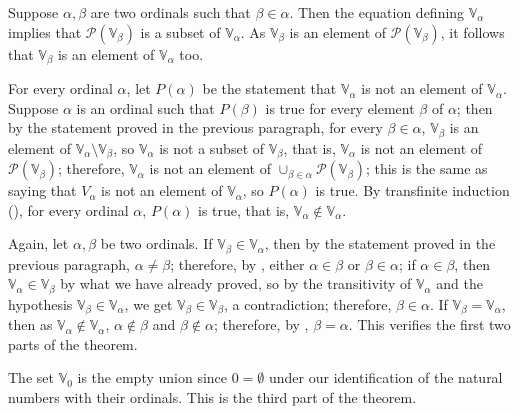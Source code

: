\documentclass{article}
\begin{document}
Suppose \(\alpha, \beta\) are two ordinals such that
\(\beta \in \alpha\).  Then the equation defining
\(\mathbb{V}_\alpha\) implies that \(\mathcal{P}(\mathbb{V}_\beta)\)
is a subset of \(\mathbb{V}_\alpha\).  As \(\mathbb{V}_\beta\) is an
element of \(\mathcal{P}(\mathbb{V}_\beta)\), it follows that
\(\mathbb{V}_\beta\) is an element of \(\mathbb{V}_\alpha\) too.

For every ordinal \(\alpha\), let \(P(\alpha)\) be the statement that
\(\mathbb{V}_\alpha\) is not an element of \(\mathbb{V}_\alpha\).
Suppose \(\alpha\) is an ordinal such that \(P(\beta)\) is true for
every element \(\beta\) of \(\alpha\); then by the statement proved in
the previous paragraph, for every \(\beta \in \alpha\),
\(\mathbb{V}_\beta\) is an element of
\(\mathbb{V}_\alpha \setminus \mathbb{V}_\beta\), so
\(\mathbb{V}_\alpha\) is not a subset of \(\mathbb{V}_\beta\), that
is, \(\mathbb{V}_\alpha\) is not an element of
\(\mathcal{P}(\mathbb{V}_\beta)\); therefore, \(\mathbb{V}_\alpha\) is
not an element of
\(\cup_{\beta \in \alpha} \mathcal{P}(\mathbb{V}_\beta)\); this is the
same as saying that \(V_\alpha\) is not an element of
\(\mathbb{V}_\alpha\), so \(P(\alpha)\) is true.  By transfinite
induction (), for every ordinal \(\alpha\),
\(P(\alpha)\) is true, that is,
\(\mathbb{V}_\alpha \notin \mathbb{V}_\alpha\).

Again, let \(\alpha, \beta\) be two ordinals.  If
\(\mathbb{V}_\beta \in \mathbb{V}_\alpha\), then by the statement
proved in the previous paragraph, \(\alpha \neq \beta\); therefore, by
, either \(\alpha \in \beta\) or
\(\beta \in \alpha\); if \(\alpha \in \beta\), then
\(\mathbb{V}_\alpha \in \mathbb{V}_\beta\) by what we have already
proved, so by the transitivity of \(\mathbb{V}_\alpha\) and the
hypothesis \(\mathbb{V}_\beta \in \mathbb{V}_\alpha\), we get
\(\mathbb{V}_\beta \in \mathbb{V}_\beta\), a contradiction; therefore,
\(\beta \in \alpha\).  If \(\mathbb{V}_\beta = \mathbb{V}_\alpha\),
then as \(\mathbb{V}_\alpha \notin \mathbb{V}_\alpha\),
\(\alpha \notin \beta\) and \(\beta \notin \alpha\); therefore, by
, \(\beta = \alpha\).  This verifies the first two
parts of the theorem.

The set \(\mathbb{V}_0\) is the empty union since \(0 = \emptyset\)
under our identification of the natural numbers with their ordinals.
This is the third part of the theorem.
\end{document}
